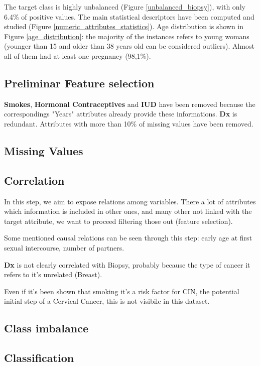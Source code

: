 The target class is highly unbalanced (Figure \ref{unbalanced_biopsy}), with only 6.4\% of positive values.
The main statistical descriptors have been computed and studied (Figure \ref{numeric_attributes_statistics}). Age distribution is shown in Figure \ref{age_distribution}: the majority of the instances refers to young womans (younger than 15 and older than 38 years old can be considered outliers). Almost all of them had at least one pregnancy (98,1\%).

\subsection{Preliminar Feature selection}

\textbf{Smokes}, \textbf{Hormonal Contraceptives} and \textbf{IUD} have been removed because the correspondings "Years" attributes already provide these informations. \textbf{Dx} is redundant. Attributes with more than 10\% of missing values have been removed.


\subsection{Missing Values}


\subsection{Correlation}

In this step, we aim to expose relations among variables. There a lot of attributes which information is included in other ones, and many other not linked with the target attribute, we want to proceed filtering those out (feature selection).

Some mentioned causal relations can be seen through this step: early age at first sexual intercourse, number of partners.

\textbf{Dx} is not clearly correlated with Biopsy, probably because the type of cancer it refers to it's unrelated (Breast).

Even if it's been shown that smoking it's a risk factor for CIN, the potential initial step of a Cervical Cancer, this is not visibile in this dataset.


\subsection{Class imbalance}
\subsection{Classification}

